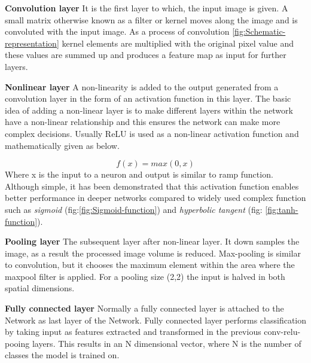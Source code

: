 \newpara \textbf{Convolution layer} It is the first layer to which, the input image is given. A small matrix otherwise known as a filter or kernel moves along the image and is convoluted with the input image. As a process of convolution \ref{fig:Schematic-representation} kernel elements are multiplied with the original pixel value and these values are summed up and produces a feature map as input for further layers.
 
\newpara \textbf{Nonlinear layer}
A non-linearity is added to the output generated from a convolution layer in the form of an activation function in this layer. The basic idea of adding a non-linear layer is to make different layers within the network have a non-linear relationship and this ensures the network can make more complex decisions.
Usually ReLU is used as a non-linear activation function and mathematically given as below.

\begin{equation}
	f(x) =max(0, x)
\end {equation}
Where x is the input to a neuron and output is similar to ramp function.
Although simple, it has been demonstrated that this activation function enables better performance in deeper networks compared to widely used complex function such as \textit{sigmoid} (fig:\ref{fig:Sigmoid-function}) and \textit{hyperbolic tangent} (fig: \ref{fig:tanh-function}).

\newpara \textbf{Pooling layer}
The subsequent layer after non-linear layer. It down samples the image, as a result the processed image volume is reduced. Max-pooling is similar to convolution, but it chooses the maximum element within the area where the maxpool filter is applied. For a pooling size (2,2) the input is halved in both spatial dimensions.

\newpara \textbf{Fully connected layer}
Normally a fully connected layer is attached to the Network as last layer of the Network. Fully connected layer performs classification by taking input as features extracted and transformed in the previous conv-relu-pooing layers. This results in an N dimensional vector, where N is the number of classes the model is trained on.

